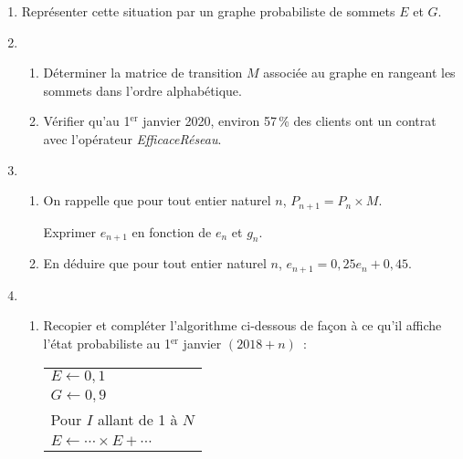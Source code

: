 \begin{enumerate}
     \item Représenter cette situation par un graphe probabiliste de sommets $E$ et $G$.
     \par
     \item
     \begin{enumerate}[label=\alph*.]
          \item Déterminer la matrice de transition $M$ associée au graphe en rangeant les sommets dans l'ordre alphabétique.
          \item Vérifier qu'au 1${^\text{er}}$ janvier 2020, environ 57\,\% des clients ont un contrat avec l'opérateur \emph{EfficaceRéseau}.
     \end{enumerate}
     \par
     \item
     \begin{enumerate}[label=\alph*.]
          \item On rappelle que pour tout entier naturel $n$, $P_{n+1} = P_n\times M$.
          \par
          Exprimer $e_{n+1}$ en fonction de $e_n$ et $g_n$.
          \par
          \item En déduire que pour tout entier naturel $n$, $e_{n+1} = 0,25 e_n + 0,45$.
     \end{enumerate}
     \par
     \item
     \begin{enumerate}[label=\alph*.]
          \item Recopier et compléter l'algorithme ci-dessous de façon à ce qu'il affiche l'état probabiliste au 1${^\text{er}}$ janvier $(2018+n)$~:
          \begin{center}
               \begin{extern}%
                    \renewcommand{\arraystretch}{1.3}
                    \begin{tabular}{|l|}
                         \hline
                         $E\longleftarrow 0,1$\\
                         $G \longleftarrow 0,9$\\
                         Pour $I$ allant de 1 à $N$\hspace*{3cm}\\
                         \hspace*{1cm} $E \longleftarrow \cdots \times E + \cdots $\\

\end{tabular}
\end{extern}
\end{center}
\end{enumerate}
\end{enumerate}
